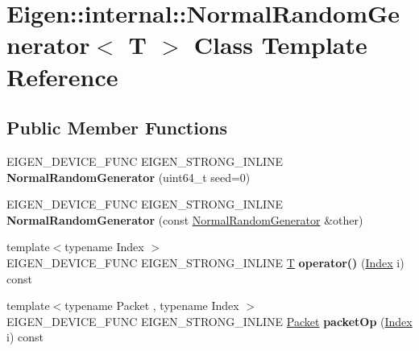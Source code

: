 \hypertarget{class_eigen_1_1internal_1_1_normal_random_generator}{}\section{Eigen\+:\+:internal\+:\+:Normal\+Random\+Generator$<$ T $>$ Class Template Reference}
\label{class_eigen_1_1internal_1_1_normal_random_generator}
\subsection*{Public Member Functions}
\begin{DoxyCompactItemize}
\item 
\mbox{\label{class_eigen_1_1internal_1_1_normal_random_generator_a48f80fcfab1b8040a62d0e04ac684832}} 
E\+I\+G\+E\+N\+\_\+\+D\+E\+V\+I\+C\+E\+\_\+\+F\+U\+NC E\+I\+G\+E\+N\+\_\+\+S\+T\+R\+O\+N\+G\+\_\+\+I\+N\+L\+I\+NE {\bfseries Normal\+Random\+Generator} (uint64\+\_\+t seed=0)
\item 
\mbox{\label{class_eigen_1_1internal_1_1_normal_random_generator_a72f987949922e688ad90d874a0907b88}} 
E\+I\+G\+E\+N\+\_\+\+D\+E\+V\+I\+C\+E\+\_\+\+F\+U\+NC E\+I\+G\+E\+N\+\_\+\+S\+T\+R\+O\+N\+G\+\_\+\+I\+N\+L\+I\+NE {\bfseries Normal\+Random\+Generator} (const \hyperlink{class_eigen_1_1internal_1_1_normal_random_generator}{Normal\+Random\+Generator} \&other)
\item 
\mbox{\label{class_eigen_1_1internal_1_1_normal_random_generator_a8a82e8b1a9eb53b2ef7d8fd81c631c2d}} 
{\footnotesize template$<$typename Index $>$ }\\E\+I\+G\+E\+N\+\_\+\+D\+E\+V\+I\+C\+E\+\_\+\+F\+U\+NC E\+I\+G\+E\+N\+\_\+\+S\+T\+R\+O\+N\+G\+\_\+\+I\+N\+L\+I\+NE \hyperlink{group___sparse_core___module}{T} {\bfseries operator()} (\hyperlink{namespace_eigen_a62e77e0933482dafde8fe197d9a2cfde}{Index} i) const
\item 
\mbox{\label{class_eigen_1_1internal_1_1_normal_random_generator_a52364af996e11edf4fad190b1892b370}} 
{\footnotesize template$<$typename Packet , typename Index $>$ }\\E\+I\+G\+E\+N\+\_\+\+D\+E\+V\+I\+C\+E\+\_\+\+F\+U\+NC E\+I\+G\+E\+N\+\_\+\+S\+T\+R\+O\+N\+G\+\_\+\+I\+N\+L\+I\+NE \hyperlink{union_eigen_1_1internal_1_1_packet}{Packet} {\bfseries packet\+Op} (\hyperlink{namespace_eigen_a62e77e0933482dafde8fe197d9a2cfde}{Index} i) const

\end{DoxyCompactItemize}
